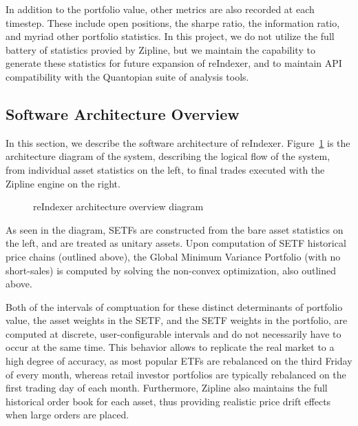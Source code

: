 \documentclass[../main.tex]{subfiles}
\begin{document}
In addition to the portfolio value, other metrics are also recorded at each timestep. These include open positions, the sharpe ratio, the information ratio, and myriad other portfolio statistics. In this project, we do not utilize the full battery of statistics provied by Zipline, but we maintain the capability to generate these statistics for future expansion of reIndexer, and to maintain API compatibility with the Quantopian suite of analysis tools.

\pagebreak

\subsection{Software Architecture Overview}

In this section, we describe the software architecture of reIndexer. Figure~\ref{fig:candidate_universe_ranking:reindexer_architecture} is the architecture diagram of the system, describing the logical flow of the system, from individual asset statistics on the left, to final trades executed with the Zipline engine on the right.

\begin{figure}[h!]
    \centering
    \caption{reIndexer architecture overview diagram}
    \label{fig:candidate_universe_ranking:reindexer_architecture}
\end{figure}

As seen in the diagram, SETFs are constructed from the bare asset statistics on the left, and are treated as unitary assets. Upon computation of SETF historical price chains (outlined above), the Global Minimum Variance Portfolio (with no short-sales) is computed by solving the non-convex optimization, also outlined above.

Both of the intervals of comptuation for these distinct determinants of portfolio value, the asset weights in the SETF, and the SETF weights in the portfolio, are computed at discrete, user-configurable intervals and do not necessarily have to occur at the same time. This behavior allows to replicate the real market to a high degree of accuracy, as most popular ETFs are rebalanced on the third Friday of every month, whereas retail investor portfolios are typically rebalanced on the first trading day of each month. Furthermore, Zipline also maintains the full historical order book for each asset, thus providing realistic price drift effects when large orders are placed.
\end{document}
